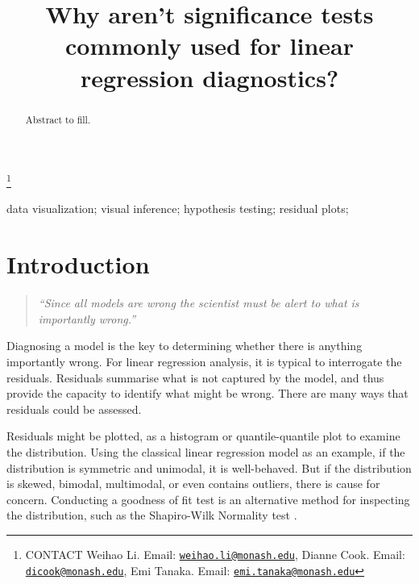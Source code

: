 \documentclass[]{interact}
\theoremstyle{plain}%
\theoremstyle{definition}
\theoremstyle{remark}
\begin{document}

\title{Why aren't significance tests commonly used for linear regression
diagnostics?}


\author{
}

\thanks{CONTACT Weihao
Li. Email: \href{mailto:weihao.li@monash.edu}{\nolinkurl{weihao.li@monash.edu}}, Dianne
Cook. Email: \href{mailto:dicook@monash.edu}{\nolinkurl{dicook@monash.edu}}, Emi
Tanaka. Email: \href{mailto:emi.tanaka@monash.edu}{\nolinkurl{emi.tanaka@monash.edu}}}

\maketitle

\begin{abstract}
Abstract to fill.
\end{abstract}

\begin{keywords}
data visualization; visual inference; hypothesis testing; residual
plots;
\end{keywords}

\hypertarget{introduction}{%
\section{Introduction}\label{introduction}}

\begin{quote}
\emph{``Since all models are wrong the scientist must be alert to what
is importantly wrong.''} \citep{box1976science}
\end{quote}

Diagnosing a model is the key to determining whether there is anything
importantly wrong. For linear regression analysis, it is typical to
interrogate the residuals. Residuals summarise what is not captured by
the model, and thus provide the capacity to identify what might be
wrong. There are many ways that residuals could be assessed.

Residuals might be plotted, as a histogram or quantile-quantile plot to
examine the distribution. Using the classical linear regression model as
an example, if the distribution is symmetric and unimodal, it is
well-behaved. But if the distribution is skewed, bimodal, multimodal, or
even contains outliers, there is cause for concern. Conducting a
goodness of fit test is an alternative method for inspecting the
distribution, such as the Shapiro-Wilk Normality test
\citep{shapiro1965analysis}.
\end{document}
